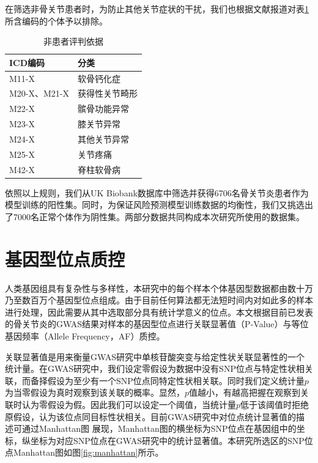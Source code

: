 在筛选非骨关节患者时，为防止其他关节症状的干扰，我们也根据文献报道对表\ref{ICD_exclude}所含编码的个体予以排除。

\begin{table}[!h]
	\renewcommand{\arraystretch}{1.2}
	\centering\wuhao
	\caption{非患者评判依据} \label{ICD_exclude} \vspace{2mm}
	\begin{tabularx}{\textwidth} { 
   >{\centering\arraybackslash}X 
   >{\centering\arraybackslash}X }
	\toprule[1.5pt]
		ICD编码 & 分类 \\
	\midrule[1pt]
		M11-X & 软骨钙化症 \\
        M20-X、M21-X & 获得性关节畸形 \\
        M22-X & 髌骨功能异常 \\
        M23-X & 膝关节异常 \\
        M24-X & 其他关节异常 \\
        M25-X & 关节疼痛 \\
        M42-X & 脊柱软骨病 \\
	\bottomrule[1.5pt]
	\end{tabularx}
\end{table}

依照以上规则，我们从UK Biobank数据库中筛选并获得6706名骨关节炎患者作为模型训练的阳性集。同时，为保证风险预测模型训练数据的均衡性，我们又挑选出了7000名正常个体作为阴性集。两部分数据共同构成本次研究所使用的数据集。

\section{基因型位点质控}

人类基因组具有复杂性与多样性，本研究中的每个样本个体基因型数据都由数十万乃至数百万个基因型位点组成。由于目前任何算法都无法短时间内对如此多的样本进行处理，因此需要从其中选取部分具有统计学意义的位点。本文根据目前已发表的骨关节炎的GWAS结果\cite{zengini_genome-wide_2018,arcogen_consortium_identification_2019}对样本的基因型位点进行关联显著值（P-Value）与等位基因频率（Allele Frequency，AF）质控。

关联显著值是用来衡量GWAS研究中单核苷酸突变与给定性状关联显著性的一个统计量。在GWAS研究中，我们设定零假设为数据中没有SNP位点与特定性状相关联，而备择假设为至少有一个SNP位点同特定性状相关联。同时我们定义统计量$p$为当零假设为真时观察到该关联的概率。显然，$p$值越小，有越高把握在观察到关联时认为零假设为假。因此我们可以设定一个阈值，当统计量$p$低于该阈值时拒绝原假设，认为该位点同目标性状相关\cite{chen_revisiting_2021}。目前GWAS研究中对位点统计显著值的描述可通过Manhattan图
展现，Manhattan图的横坐标为SNP位点在基因组中的坐标，纵坐标为对应SNP位点在GWAS研究中的统计显著值。本研究所选区的SNP位点Manhattan图如图\ref{fig:manhattan}所示。

